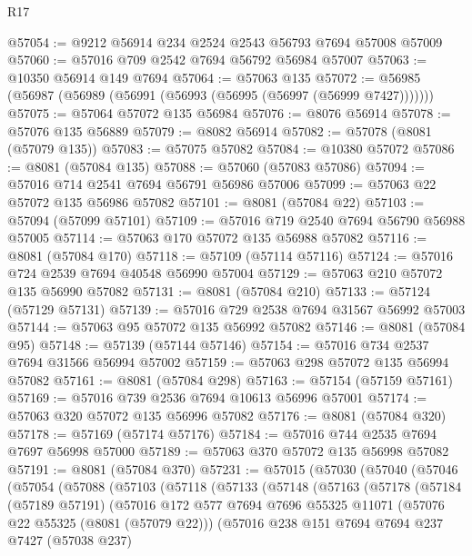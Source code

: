 \begin{lexlean}{R17}
\begin{coremodule}
@57054 := @9212 @56914 @234 @2524 @2543 @56793 @7694 @57008 @57009
@57060 := @57016 @709 @2542 @7694 @56792 @56984 @57007
@57063 := @10350 @56914 @149 @7694
@57064 := @57063 @135
@57072 := @56985 (@56987 (@56989 (@56991 (@56993 (@56995 (@56997 (@56999 @7427)))))))
@57075 := @57064 @57072 @135 @56984
@57076 := @8076 @56914
@57078 := @57076 @135 @56889
@57079 := @8082 @56914
@57082 := @57078 (@8081 (@57079 @135))
@57083 := @57075 @57082
@57084 := @10380 @57072
@57086 := @8081 (@57084 @135)
@57088 := @57060 (@57083 @57086)
@57094 := @57016 @714 @2541 @7694 @56791 @56986 @57006
@57099 := @57063 @22 @57072 @135 @56986 @57082
@57101 := @8081 (@57084 @22)
@57103 := @57094 (@57099 @57101)
@57109 := @57016 @719 @2540 @7694 @56790 @56988 @57005
@57114 := @57063 @170 @57072 @135 @56988 @57082
@57116 := @8081 (@57084 @170)
@57118 := @57109 (@57114 @57116)
@57124 := @57016 @724 @2539 @7694 @40548 @56990 @57004
@57129 := @57063 @210 @57072 @135 @56990 @57082
@57131 := @8081 (@57084 @210)
@57133 := @57124 (@57129 @57131)
@57139 := @57016 @729 @2538 @7694 @31567 @56992 @57003
@57144 := @57063 @95 @57072 @135 @56992 @57082
@57146 := @8081 (@57084 @95)
@57148 := @57139 (@57144 @57146)
@57154 := @57016 @734 @2537 @7694 @31566 @56994 @57002
@57159 := @57063 @298 @57072 @135 @56994 @57082
@57161 := @8081 (@57084 @298)
@57163 := @57154 (@57159 @57161)
@57169 := @57016 @739 @2536 @7694 @10613 @56996 @57001
@57174 := @57063 @320 @57072 @135 @56996 @57082
@57176 := @8081 (@57084 @320)
@57178 := @57169 (@57174 @57176)
@57184 := @57016 @744 @2535 @7694 @7697 @56998 @57000
@57189 := @57063 @370 @57072 @135 @56998 @57082
@57191 := @8081 (@57084 @370)
@57231 := @57015
    (@57030
      (@57040
        (@57046
          (@57054
            (@57088
              (@57103
                (@57118
                  (@57133
                    (@57148
                      (@57163
                        (@57178
                          (@57184
                            (@57189 @57191)
                            (@57016
                              @172
                              @577
                              @7694
                              @7696
                              @55325
                              @11071
                              (@57076 @22 @55325 (@8081 (@57079 @22)))
                              (@57016
                                @238
                                @151
                                @7694
                                @7694
                                @237
                                @7427
                                (@57038 @237)

\end{coremodule}
\end{lexlean}
